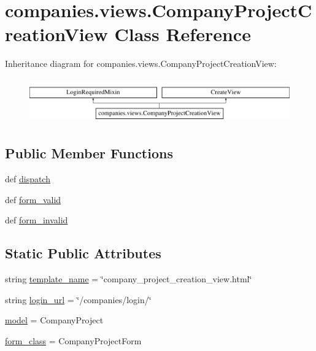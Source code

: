 \hypertarget{classcompanies_1_1views_1_1_company_project_creation_view}{\section{companies.\-views.\-Company\-Project\-Creation\-View Class Reference}
\label{classcompanies_1_1views_1_1_company_project_creation_view}
}
Inheritance diagram for companies.\-views.\-Company\-Project\-Creation\-View\-:\begin{figure}[H]
\begin{center}
\leavevmode
\includegraphics[height=1.937716cm]{classcompanies_1_1views_1_1_company_project_creation_view}
\end{center}
\end{figure}
\subsection*{Public Member Functions}
\begin{DoxyCompactItemize}
\item 
def \hyperlink{classcompanies_1_1views_1_1_company_project_creation_view_aedf00475bad24d4f14e9058a337113d5}{dispatch}
\item 
def \hyperlink{classcompanies_1_1views_1_1_company_project_creation_view_a493c893a06f21cee6b79ae64b84f5151}{form\-\_\-valid}
\item 
def \hyperlink{classcompanies_1_1views_1_1_company_project_creation_view_ada843f6c28403b9e4bf4877598947c2e}{form\-\_\-invalid}
\end{DoxyCompactItemize}
\subsection*{Static Public Attributes}
\begin{DoxyCompactItemize}
\item 
string \hyperlink{classcompanies_1_1views_1_1_company_project_creation_view_ab3bcfcae7ebc6a57a02e9219d032f710}{template\-\_\-name} = \char`\"{}company\-\_\-project\-\_\-creation\-\_\-view.\-html\char`\"{}
\item 
string \hyperlink{classcompanies_1_1views_1_1_company_project_creation_view_a47104c00212f52d51f06dce01085c46b}{login\-\_\-url} = \char`\"{}/companies/login/\char`\"{}
\item 
\hyperlink{classcompanies_1_1views_1_1_company_project_creation_view_a0a098bbc71e25cb6d6fad1a7a61b5e13}{model} = Company\-Project
\item 
\hyperlink{classcompanies_1_1views_1_1_company_project_creation_view_a74ab34dce8a36ad6708524c69ac7b887}{form\-\_\-class} = Company\-Project\-Form
\end{DoxyCompactItemize}


